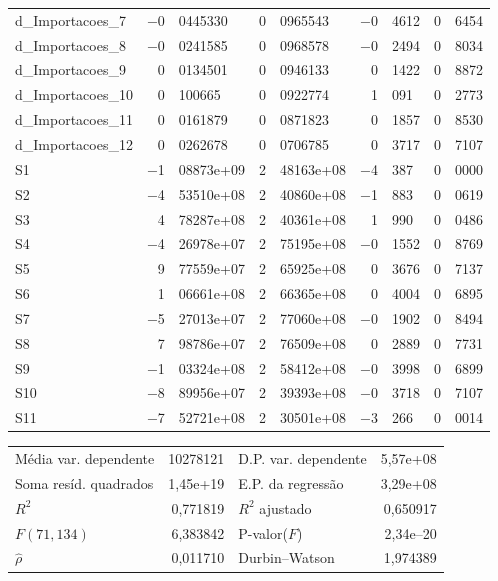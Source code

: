 \documentclass[11pt]{article}
\begin{document}
\begin{center}
\begin{tabular}{lr@{,}lr@{,}lr@{,}lr@{,}l}
d\_Importacoes\_7 &
  $-$0&0445330 &
    0&0965543 &
      $-$0&4612 &
        0&6454 \\
d\_Importacoes\_8 &
  $-$0&0241585 &
    0&0968578 &
      $-$0&2494 &
        0&8034 \\
d\_Importacoes\_9 &
  0&0134501 &
    0&0946133 &
      0&1422 &
        0&8872 \\
d\_Importacoes\_10 &
  0&100665 &
    0&0922774 &
      1&091 &
        0&2773 \\
d\_Importacoes\_11 &
  0&0161879 &
    0&0871823 &
      0&1857 &
        0&8530 \\
d\_Importacoes\_12 &
  0&0262678 &
    0&0706785 &
      0&3717 &
        0&7107 \\
S1 &
  $-$1&08873\textrm{e+09} &
    2&48163\textrm{e+08} &
      $-$4&387 &
        0&0000 \\
S2 &
  $-$4&53510\textrm{e+08} &
    2&40860\textrm{e+08} &
      $-$1&883 &
        0&0619 \\
S3 &
  4&78287\textrm{e+08} &
    2&40361\textrm{e+08} &
      1&990 &
        0&0486 \\
S4 &
  $-$4&26978\textrm{e+07} &
    2&75195\textrm{e+08} &
      $-$0&1552 &
        0&8769 \\
S5 &
  9&77559\textrm{e+07} &
    2&65925\textrm{e+08} &
      0&3676 &
        0&7137 \\
S6 &
  1&06661\textrm{e+08} &
    2&66365\textrm{e+08} &
      0&4004 &
        0&6895 \\
S7 &
  $-$5&27013\textrm{e+07} &
    2&77060\textrm{e+08} &
      $-$0&1902 &
        0&8494 \\
S8 &
  7&98786\textrm{e+07} &
    2&76509\textrm{e+08} &
      0&2889 &
        0&7731 \\
S9 &
  $-$1&03324\textrm{e+08} &
    2&58412\textrm{e+08} &
      $-$0&3998 &
        0&6899 \\
S10 &
  $-$8&89956\textrm{e+07} &
    2&39393\textrm{e+08} &
      $-$0&3718 &
        0&7107 \\
S11 &
  $-$7&52721\textrm{e+08} &
    2&30501\textrm{e+08} &
      $-$3&266 &
        0&0014 \\
\end{tabular}

\vspace{1ex}
\begin{tabular}{lrlr}
Média var. dependente &  10278121 & D.P. var. dependente &  5,57\textrm{e+08} \\
Soma resíd. quadrados &  1,45\textrm{e+19} & E.P. da regressão &  3,29\textrm{e+08} \\
$R^2$ &  0,771819 & $R^2$ ajustado &  0,650917 \\
$F(71, 134)$ &  6,383842 & P-valor($F$) &  2,34\textrm{e--20} \\
$\hat{\rho}$ &  0,011710 & Durbin--Watson &  1,974389 \\
\end{tabular}


\end{center}
\end{document}
